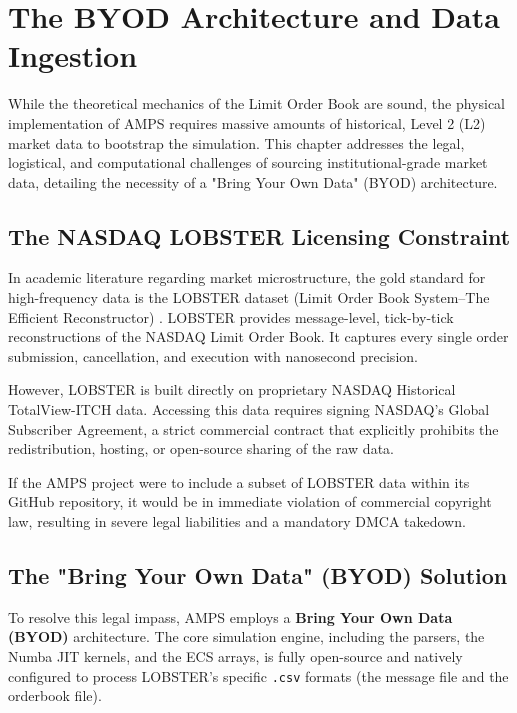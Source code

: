 \chapter{The BYOD Architecture and Data Ingestion}
\label{ch:byod_architecture}

While the theoretical mechanics of the Limit Order Book are sound, the physical implementation of AMPS requires massive amounts of historical, Level 2 (L2) market data to bootstrap the simulation. This chapter addresses the legal, logistical, and computational challenges of sourcing institutional-grade market data, detailing the necessity of a "Bring Your Own Data" (BYOD) architecture.

\section{The NASDAQ LOBSTER Licensing Constraint}

In academic literature regarding market microstructure, the gold standard for high-frequency data is the LOBSTER dataset (Limit Order Book System--The Efficient Reconstructor) \cite{huang2011lobster}. LOBSTER provides message-level, tick-by-tick reconstructions of the NASDAQ Limit Order Book. It captures every single order submission, cancellation, and execution with nanosecond precision.

However, LOBSTER is built directly on proprietary NASDAQ Historical TotalView-ITCH data. Accessing this data requires signing NASDAQ's Global Subscriber Agreement, a strict commercial contract that explicitly prohibits the redistribution, hosting, or open-source sharing of the raw data. 

If the AMPS project were to include a subset of LOBSTER data within its GitHub repository, it would be in immediate violation of commercial copyright law, resulting in severe legal liabilities and a mandatory DMCA takedown.

\section{The "Bring Your Own Data" (BYOD) Solution}

To resolve this legal impass, AMPS employs a \textbf{Bring Your Own Data (BYOD)} architecture. The core simulation engine, including the parsers, the Numba JIT kernels, and the ECS arrays, is fully open-source and natively configured to process LOBSTER's specific \texttt{.csv} formats (the message file and the orderbook file).

